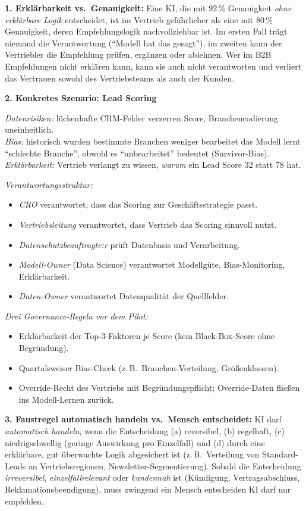 \documentclass[11pt,a4paper,oneside]{article}
\begin{document}
\begin{loesungbox}
\textbf{1. Erklärbarkeit vs.\ Genauigkeit:}
Eine KI, die mit 92\,\% Genauigkeit \emph{ohne erklärbare Logik} entscheidet, ist im Vertrieb gefährlicher als eine mit 80\,\% Genauigkeit, deren Empfehlungslogik nachvollziehbar ist. Im ersten Fall trägt niemand die Verantwortung (``Modell hat das gesagt''), im zweiten kann der Vertriebler die Empfehlung prüfen, ergänzen oder ablehnen. Wer im B2B Empfehlungen nicht erklären kann, kann sie auch nicht verantworten \textendash{} und verliert das Vertrauen sowohl des Vertriebsteams als auch der Kunden.

\smallskip
\textbf{2. Konkretes Szenario: Lead Scoring}

\smallskip
\emph{Datenrisiken:} lückenhafte CRM-Felder verzerren Score, Branchencodierung uneinheitlich.\\
\emph{Bias:} historisch wurden bestimmte Branchen weniger bearbeitet \textendash{} das Modell lernt ``schlechte Branche'', obwohl es ``unbearbeitet'' bedeutet (Survivor-Bias).\\
\emph{Erklärbarkeit:} Vertrieb verlangt zu wissen, \emph{warum} ein Lead Score 32 statt 78 hat.

\smallskip
\emph{Verantwortungsstruktur:}
\begin{itemize}
  \item \emph{CRO} verantwortet, dass das Scoring zur Geschäftsstrategie passt.
  \item \emph{Vertriebsleitung} verantwortet, dass Vertrieb das Scoring sinnvoll nutzt.
  \item \emph{Datenschutzbeauftragte:r} prüft Datenbasis und Verarbeitung.
  \item \emph{Modell-Owner} (Data Science) verantwortet Modellgüte, Bias-Monitoring, Erklärbarkeit.
  \item \emph{Daten-Owner} verantwortet Datenqualität der Quellfelder.
\end{itemize}

\emph{Drei Governance-Regeln vor dem Pilot:}
\begin{itemize}
  \item Erklärbarkeit der Top-3-Faktoren je Score (kein Black-Box-Score ohne Begründung).
  \item Quartalsweiser Bias-Check (z.\,B.\ Branchen-Verteilung, Größenklassen).
  \item Override-Recht des Vertriebs mit Begründungspflicht; Override-Daten fließen ins Modell-Lernen zurück.
\end{itemize}

\textbf{3. Faustregel \textendash{} automatisch handeln vs.\ Mensch entscheidet:}
KI darf \emph{automatisch handeln}, wenn die Entscheidung (a) reversibel, (b) regelhaft, (c) niedrigschwellig (geringe Auswirkung pro Einzelfall) und (d) durch eine erklärbare, gut überwachte Logik abgesichert ist (z.\,B.\ Verteilung von Standard-Leads an Vertriebsregionen, Newsletter-Segmentierung). Sobald die Entscheidung \emph{irreversibel}, \emph{einzelfallrelevant} oder \emph{kundennah} ist (Kündigung, Vertragsabschluss, Reklamationsbeendigung), muss zwingend ein Mensch entscheiden \textendash{} KI darf nur empfehlen.
\end{loesungbox}
\end{document}
